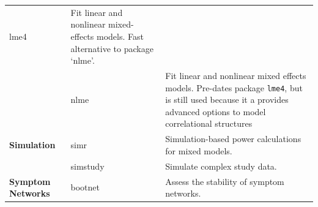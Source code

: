 \documentclass[]{book}
\begin{document}
\begin{longtable}[]{@{}lll@{}}
\begin{minipage}[t]{0.23\columnwidth}
lme4\strut
\end{minipage} & \begin{minipage}[t]{0.48\columnwidth}\raggedright\strut
Fit linear and nonlinear mixed-effects models. Fast alternative to
package `nlme'.\strut
\end{minipage}\tabularnewline
\begin{minipage}[t]{0.21\columnwidth}\raggedright\strut
\strut
\end{minipage} & \begin{minipage}[t]{0.23\columnwidth}\raggedright\strut
nlme\strut
\end{minipage} & \begin{minipage}[t]{0.48\columnwidth}\raggedright\strut
Fit linear and nonlinear mixed effects models. Pre-dates package
\texttt{lme4}, but is still used because it a provides advanced options
to model correlational structures\strut
\end{minipage}\tabularnewline
\begin{minipage}[t]{0.21\columnwidth}\raggedright\strut
\textbf{Simulation}\strut
\end{minipage} & \begin{minipage}[t]{0.23\columnwidth}\raggedright\strut
simr\strut
\end{minipage} & \begin{minipage}[t]{0.48\columnwidth}\raggedright\strut
Simulation-based power calculations for mixed models.\strut
\end{minipage}\tabularnewline
\begin{minipage}[t]{0.21\columnwidth}\raggedright\strut
\strut
\end{minipage} & \begin{minipage}[t]{0.23\columnwidth}\raggedright\strut
simstudy\strut
\end{minipage} & \begin{minipage}[t]{0.48\columnwidth}\raggedright\strut
Simulate complex study data.\strut
\end{minipage}\tabularnewline
\begin{minipage}[t]{0.21\columnwidth}\raggedright\strut
\textbf{Symptom Networks}\strut
\end{minipage} & \begin{minipage}[t]{0.23\columnwidth}\raggedright\strut
bootnet\strut
\end{minipage} & \begin{minipage}[t]{0.48\columnwidth}\raggedright\strut
Assess the stability of symptom networks.\strut
\end{minipage}\tabularnewline

\end{longtable}
\end{document}

